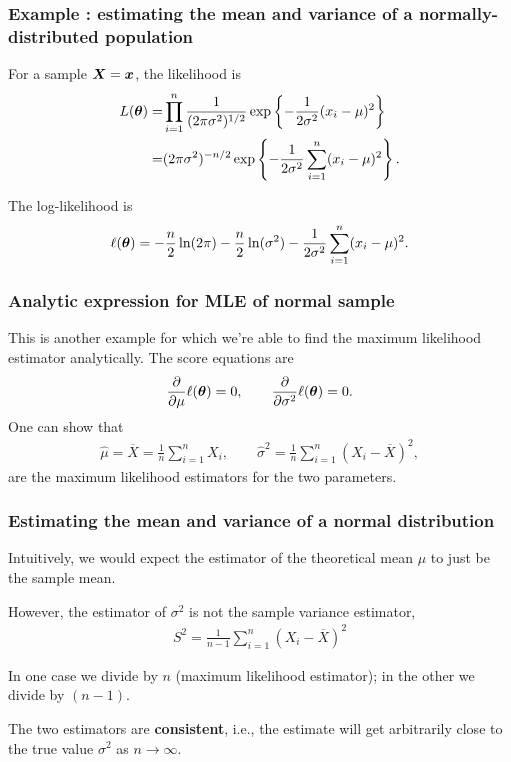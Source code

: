 \documentclass{beamer}
\begin{document}
\begin{frame}
\frametitle{Example : estimating the mean and variance of a normally-distributed population}
\bi
\item For a sample $\boldsymbol {X}=\boldsymbol {x}$, the likelihood is 
\begin{align*}
L(\boldsymbol {\theta})=&\prod_{i=1}^n\frac{1}{({2\pi \sigma^2})^{1/2}}\exp\left\{-\frac{1}{2\sigma^2}(x_i-\mu)^2\right\}\\
=&(2\pi \sigma^2)^{-n/2}\exp\left\{-\frac{1}{2\sigma^2}\sum_{i=1}^n(x_i-\mu)^2\right\}.
\end{align*}
\item The log-likelihood is
\begin{align*}
\ell(\boldsymbol {\theta})=-\frac{n}{2}\ln(2\pi) -\frac{n}{2}\ln(\sigma^2)-\frac{1}{2\sigma^2}\sum_{i=1}^n (x_i-\mu)^2.
\end{align*}
\ei
\end{frame}

\begin{frame}
\frametitle{Analytic expression for MLE of normal sample}
This is another example for which we're able to find the maximum likelihood estimator analytically. The \alert{score equations} are
\begin{align*}
\frac{\partial}{\partial \mu} \ell(\boldsymbol {\theta})=0 , \qquad \frac{\partial}{\partial \sigma^2} \ell(\boldsymbol {\theta})=0.
\end{align*}
One can show that 
\begin{align*}
\hat{\mu}=\overline{X}=\frac{1}{n} \sum_{i=1}^n X_i, \qquad \hat{\sigma}^2=\frac{1}{n}\sum_{i=1}^n (X_i-\overline{X})^2,
\end{align*}
are the maximum likelihood estimators for the two parameters.

\end{frame}

\begin{frame}
\frametitle{Estimating the mean and variance of a normal distribution}
\bi
\item Intuitively, we would expect the estimator of the theoretical mean $\mu$ to just be the sample mean. 
\item However, the estimator of $\sigma^2$ is not the sample variance estimator,
\begin{align*}
S^2=\frac{1}{n-1} \sum_{i=1}^n (X_i-\overline{X})^2
\end{align*}
\item In one case we divide by $n$ (maximum likelihood estimator); in the other we divide by $(n -1)$. 
\item The two estimators are \textbf{consistent}, i.e., the estimate will get arbitrarily close to the true value $\sigma^2$ as $n \to \infty$.
\ei
\end{frame}
\end{document}
